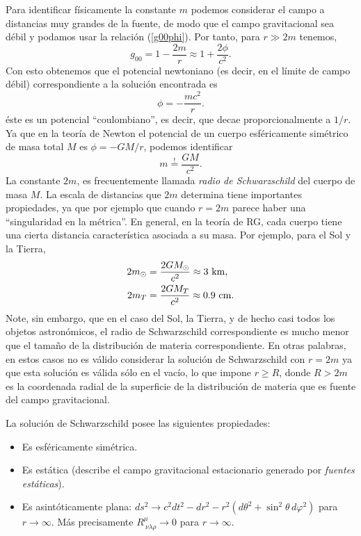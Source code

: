Para identificar físicamente la constante $m$ podemos considerar el
campo a distancias muy grandes de la fuente, de modo que el campo
gravitacional sea débil y podamos usar la relación (\ref{g00phi}). Por
tanto, para $r\gg 2m$ tenemos,
\begin{equation}
g_{00}=1-\frac{2m}{r}\approx 1+\frac{2\phi}{c^2}.
\end{equation}
Con esto obtenemos que el potencial newtoniano (es decir, en el límite de
campo débil) correspondiente a la solución encontrada es
\begin{equation}
 \phi=-\frac{mc^2}{r}.
\end{equation}
éste es un potencial ``coulombiano'', es decir, que decae proporcionalmente a $1/r$. Ya que en la teoría de Newton el potencial de un cuerpo esféricamente  simétrico de masa total $M$ es $\phi=-{GM}/ {r}$, podemos identificar
\begin{equation}\label{masa_sch}
 \boxed{m\stackrel{!}{=}\frac{GM}{c^2}.}
\end{equation}
La constante $2m$, es frecuentemente llamada \textit{radio de Schwarzschild}
del cuerpo de masa $M$. La escala de distancias que $2m$ determina tiene importantes propiedades, ya que por ejemplo que cuando $r=2m$ parece haber una
 ``singularidad en la métrica''. En general, en la teoría de RG, cada cuerpo tiene una cierta distancia característica asociada a su masa. Por ejemplo, para el Sol y la Tierra,
\begin{align}
2m_{\odot} & =\frac{2GM_\odot}{c^2}\approx 3 {\rm\ km},\\
2m_{T} & =\frac{2GM_T	}{c^2}\approx 0.9{\rm \ cm}.
\end{align}
Note, sin embargo, que en el caso del Sol, la Tierra, y de hecho casi todos los objetos astronómicos, el radio de Schwarzschild correspondiente es mucho menor que el tamaño de la distribución de materia correspondiente. En otras palabras, en estos casos no es válido considerar la solución de Schwarzschild con $r=2m$ ya que esta solución es válida sólo en el vacío, lo que impone $r\ge R$, donde $R>2m$ es la coordenada radial de la superficie de la distribución de materia que es fuente del campo gravitacional.

La solución de Schwarzschild posee las siguientes propiedades:
\begin{itemize}
\item Es esféricamente simétrica.
\item Es estática (describe el campo gravitacional estacionario generado por \textit{fuentes estáticas}).
\item Es asintóticamente plana: $ds^2\to c^2dt^2-dr^2-r^2(d\theta^2+\sin^2\theta\,d\varphi^2)$ para $r\to\infty$. Más precisamente $R^\mu_{\ \nu\lambda\rho}\to 0$ para $r\to\infty$.
\end{itemize}



